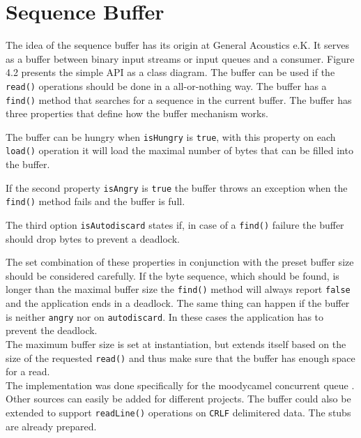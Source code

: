 \section{Sequence Buffer}
The idea of the sequence buffer has its origin at General Acoustics e.K. It serves as a buffer between binary input streams or input queues and a consumer. Figure 4.2 presents the simple API as a class diagram. The buffer can be used if the \texttt{read()} operations should be done in a all-or-nothing way. The buffer has a \texttt{find()} method that searches for a sequence in the current buffer. The buffer has three properties that define how the buffer mechanism works.
\begin{itemize}
\begin{ennumerate}
\item The buffer can be hungry when \texttt{isHungry} is \texttt{true}, with this property on each \texttt{load()} operation it will load the maximal number of bytes that can be filled into the buffer. 
\item If the second property \texttt{isAngry} is \texttt{true} the buffer throws an exception when the \texttt{find()} method fails and the buffer is full. 
\item The third option \texttt{isAutodiscard} states if, in case of a \texttt{find()} failure the buffer should drop bytes to prevent a deadlock.
\end{ennumerate}
\end{itemize}
The set combination of these properties in conjunction with the preset buffer size should be considered carefully. If the byte sequence, which should be found, is longer than the maximal buffer size the \texttt{find()} method will always report \texttt{false} and the application ends in a deadlock. The same thing can happen if the buffer is neither \texttt{angry} nor on \texttt{autodiscard}. In these cases the application has to prevent the deadlock.\\
The maximum buffer size is set at instantiation, but extends itself based on the size of the requested \texttt{read()} and thus make sure that the buffer has enough space for a read.\\
The implementation was done specifically for the moodycamel concurrent queue \cite{moody}. Other sources can easily be added for different projects. The buffer could also be extended to support \texttt{readLine()} operations on \texttt{CRLF} delimitered data. The stubs are already prepared. 
